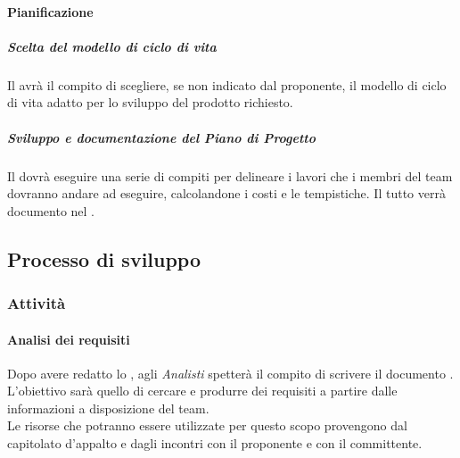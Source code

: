 			\paragraph{Pianificazione}
				\subparagraph{Scelta del modello di ciclo di vita}
				Il \roleProjectManager{} avrà il compito di scegliere, se non indicato dal proponente, il modello di ciclo di vita adatto per lo sviluppo del prodotto richiesto.
				\subparagraph{Sviluppo e documentazione del Piano di Progetto}
Il \roleProjectManager{} dovrà eseguire una serie di compiti per delineare i lavori che i membri del team dovranno andare ad eseguire, calcolandone i costi e le tempistiche. Il tutto verrà documento nel \docNameVersionPdP{}.

	\subsection{Processo di sviluppo}
		\subsubsection{Attività}
			\paragraph{Analisi dei requisiti}
			Dopo avere redatto lo \docNameSdF{}, agli \emph{Analisti} spetterà il compito di scrivere il documento \docNameVersionAdR{}. \\
			L'obiettivo sarà quello di cercare e produrre dei requisiti a partire dalle informazioni a disposizione del team. \\
			Le risorse che potranno essere utilizzate per questo scopo provengono dal capitolato d'appalto e dagli incontri con il proponente e con il committente. 
